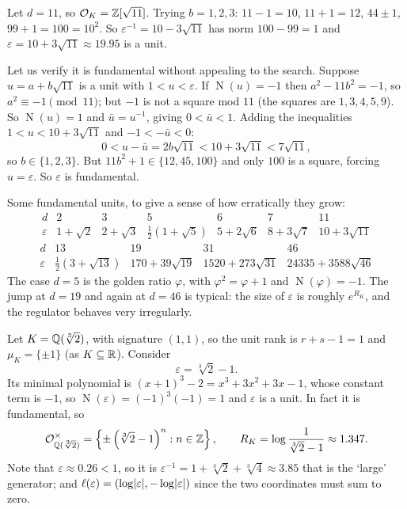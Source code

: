 \documentclass[a4paper]{scrartcl}
\renewcommand{\OO}{\mathcal{O}}
\newcommand{\Nm}{\operatorname{N}}
\begin{document}
\begin{example}
	Let $d = 11$, so $\OO_K = \Z[\sqrt{11}]$. Trying $b = 1,2,3$: $11-1 = 10$, $11+1=12$, $44\pm1$, $99+1 = 100 = 10^2$. So $\varepsilon^{-1} = 10-3\sqrt{11}$ has norm $100-99=1$ and $\varepsilon = 10+3\sqrt{11}\approx 19.95$ is a unit.

	Let us verify it is fundamental without appealing to the search. Suppose $u = a+b\sqrt{11}$ is a unit with $1 < u < \varepsilon$. If $\Nm(u) = -1$ then $a^2-11b^2 = -1$, so $a^2\equiv-1\pmod{11}$; but $-1$ is not a square mod $11$ (the squares are $1,3,4,5,9$). So $\Nm(u) = 1$ and $\bar u = u^{-1}$, giving $0 < \bar u < 1$. Adding the inequalities $1 < u < 10+3\sqrt{11}$ and $-1 < -\bar u < 0$:
	$$0 < u - \bar u = 2b\sqrt{11} < 10+3\sqrt{11} < 7\sqrt{11},$$
	so $b \in \{1,2,3\}$. But $11b^2+1 \in \{12, 45, 100\}$ and only $100$ is a square, forcing $u = \varepsilon$. So $\varepsilon$ is fundamental.
\end{example}

\begin{example}
	Some fundamental units, to give a sense of how erratically they grow:
	$$\begin{array}{c|cccccc}
		d & 2 & 3 & 5 & 6 & 7 & 11\\\hline
		\varepsilon & 1+\sqrt2 & 2+\sqrt3 & \tfrac12(1+\sqrt5) & 5+2\sqrt6 & 8+3\sqrt7 & 10+3\sqrt{11}
	\end{array}$$
	$$\begin{array}{c|cccc}
		d & 13 & 19 & 31 & 46\\\hline
		\varepsilon & \tfrac12(3+\sqrt{13}) & 170+39\sqrt{19} & 1520+273\sqrt{31} & 24335+3588\sqrt{46}
	\end{array}$$
	The case $d = 5$ is the golden ratio $\varphi$, with $\varphi^2 = \varphi+1$ and $\Nm(\varphi) = -1$. The jump at $d = 19$ and again at $d = 46$ is typical: the size of $\varepsilon$ is roughly $e^{R_K}$, and the regulator behaves very irregularly.
\end{example}

\begin{example}
	Let $K = \mathbb{Q}(\sqrt[3]2)$, with signature $(1,1)$, so the unit rank is $r+s-1 = 1$ and $\mu_K = \{\pm1\}$ (as $K \subseteq \mathbb{R}$). Consider
	$$\varepsilon = \sqrt[3]2 - 1.$$
	Its minimal polynomial is $(x+1)^3-2 = x^3+3x^2+3x-1$, whose constant term is $-1$, so $\Nm(\varepsilon) = (-1)^3(-1) = 1$ and $\varepsilon$ is a unit. In fact it is fundamental, so
	$$\OO_{\Q(\sqrt[3]2)}^\times = \left\{\pm\left(\sqrt[3]2-1\right)^n : n \in \Z\right\}, \qquad R_K = \log\frac{1}{\sqrt[3]2-1} \approx 1.347.$$
	Note that $\varepsilon \approx 0.26 < 1$, so it is $\varepsilon^{-1} = 1 + \sqrt[3]2+\sqrt[3]4 \approx 3.85$ that is the `large' generator; and $\ell(\varepsilon) = (\log\lvert\varepsilon\rvert, -\log\lvert\varepsilon\rvert)$ since the two coordinates must sum to zero.
\end{example}
\end{document}
